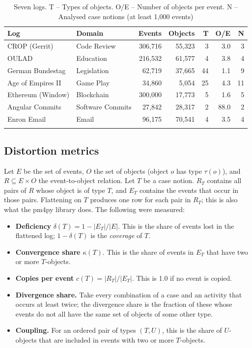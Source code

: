 \documentclass[pdflatex,sn-mathphys-num]{sn-jnl}
\begin{document}
\begin{table}[htbp]
\caption{Seven logs. T -- Types of objects. O/E -- Number of objects per event. N -- Analysed case notions (at least 1{,}000 events)}\label{tab:logs}
\footnotesize
\setlength{\tabcolsep}{3pt}
\begin{tabular*}{\textwidth}{@{\extracolsep\fill}llrrrrr}
\toprule
Log & Domain & Events & Objects & T & O/E & N \\
\midrule
CROP (Gerrit) & Code Review & 306{,}716 & 55{,}323 & 3 & 3.0 & 3 \\
OULAD & Education & 216{,}532 & 61{,}577 & 4 & 3.8 & 4 \\
German Bundestag & Legislation & 62{,}719 & 37{,}665 & 44 & 1.1 & 9 \\
Age of Empires II & Game Play & 34{,}860 & 5{,}054 & 25 & 4.3 & 11 \\
Ethereum (Window) & Blockchain & 300{,}000 & 17{,}773 & 5 & 1.6 & 5 \\
Angular Commits & Software Commits & 27{,}842 & 28{,}317 & 2 & 88.0 & 2 \\
Enron Email & Email & 96{,}175 & 70{,}541 & 4 & 3.5 & 4 \\
\botrule
\end{tabular*}
\end{table}

\subsection{Distortion metrics}\label{sec:metrics}

Let $E$ be the set of events, $O$ the set of objects (object $o$ has type $\tau(o)$), and $R \subseteq E \times O$ the event-to-object relation. Let $T$ be a case notion. $R_T$ contains all pairs of $R$ whose object is of type $T$, and $E_T$ contains the events that occur in those pairs. Flattening on $T$ produces one row for each pair in $R_T$; this is also what the pm4py library does. The following were measured:

\begin{itemize}
\item \textbf{Deficiency} $\delta(T) = 1 - |E_T| / |E|$. This is the share of events lost in the flattened log; $1 - \delta(T)$ is the \emph{coverage} of $T$.
\item \textbf{Convergence share} $\kappa(T)$. This is the share of events in $E_T$ that have two or more $T$-objects.
\item \textbf{Copies per event} $c(T) = |R_T| / |E_T|$. This is 1.0 if no event is copied.
\item \textbf{Divergence share.} Take every combination of a case and an activity that occurs at least twice; the divergence share is the fraction of these whose events do not all have the same set of objects of some other type.
\item \textbf{Coupling.} For an ordered pair of types $(T, U)$, this is the share of $U$-objects that are included in events with two or more $T$-objects.
\end{itemize}
\end{document}
